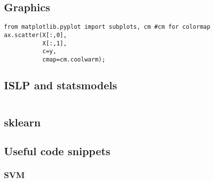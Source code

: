 \documentclass[
  letterpaper,
  DIV=11,
  numbers=noendperiod]{scrreprt}
\begin{document}
\begin{verbatim}
\end{verbatim}

\subsection{Graphics}\label{graphics-7}

\begin{verbatim}
from matplotlib.pyplot import subplots, cm #cm for colormap
ax.scatter(X[:,0],
           X[:,1],
           c=y,
           cmap=cm.coolwarm);
\end{verbatim}

\subsection{ISLP and statsmodels}\label{islp-and-statsmodels-5}

\begin{verbatim}

\end{verbatim}

\subsection{sklearn}\label{sklearn-5}

\subsection{Useful code snippets}\label{useful-code-snippets-2}

\subsubsection{SVM}\label{svm}
\end{document}
